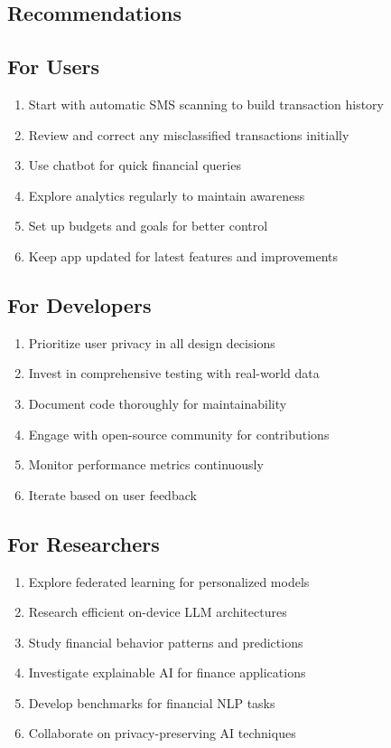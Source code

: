 \documentclass[11pt,a4paper]{report}
\begin{document}
\begin{itemize}
\section{Recommendations}

\subsection{For Users}

\begin{enumerate}
    \item Start with automatic SMS scanning to build transaction history
    \item Review and correct any misclassified transactions initially
    \item Use chatbot for quick financial queries
    \item Explore analytics regularly to maintain awareness
    \item Set up budgets and goals for better control
    \item Keep app updated for latest features and improvements
\end{enumerate}

\subsection{For Developers}

\begin{enumerate}
    \item Prioritize user privacy in all design decisions
    \item Invest in comprehensive testing with real-world data
    \item Document code thoroughly for maintainability
    \item Engage with open-source community for contributions
    \item Monitor performance metrics continuously
    \item Iterate based on user feedback
\end{enumerate}

\subsection{For Researchers}

\begin{enumerate}
    \item Explore federated learning for personalized models
    \item Research efficient on-device LLM architectures
    \item Study financial behavior patterns and predictions
    \item Investigate explainable AI for finance applications
    \item Develop benchmarks for financial NLP tasks
    \item Collaborate on privacy-preserving AI techniques
\end{enumerate}


\end{itemize}
\end{document}
